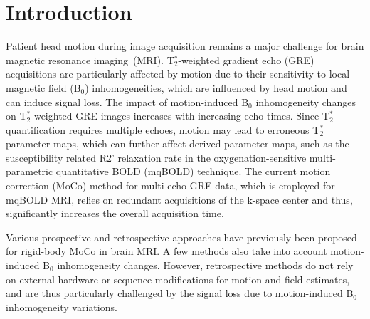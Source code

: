 \documentclass[AMA,STIX2COL]{MRM}
\newcommand{\tstar}[1]{{T$_2^*$}}
\begin{document}



\maketitle


\section{Introduction}\label{sec:intro} 
Patient head motion during image acquisition remains a major challenge for brain magnetic resonance imaging~(MRI). \tstar{}-weighted gradient echo (GRE) acquisitions are particularly affected by motion due to their sensitivity to local magnetic field (B$_0$) inhomogeneities, which are influenced by head motion and can induce signal loss.\cite{Liu_2018,Marques_2005} 
The impact of motion-induced B$_0$ inhomogeneity changes on \tstar{}-weighted GRE images increases with increasing echo times.\cite{Magerkurth_2011} 
Since \tstar{} quantification requires multiple echoes, motion may lead to erroneous \tstar{} parameter maps, 
which can further affect derived parameter maps, such as the susceptibility related R2’ relaxation rate in the oxygenation-sensitive multi-parametric quantitative BOLD (mqBOLD) technique. \cite{Hirsch_2014,Eichhorn_2023_ISMRM} The current motion correction (MoCo) method for multi-echo GRE data, which is employed for mqBOLD MRI, relies on redundant acquisitions of the k-space center and thus, significantly increases the overall acquisition time.\cite{Noth_2014}

Various prospective and retrospective approaches have previously been proposed for rigid-body MoCo in brain MRI.\cite{Godenschweger_2016} A few methods also take into account motion-induced B$_0$ inhomogeneity changes. \cite{vanderKouwe_2006,Matakos_2010,Brackenier_2022,Hewlett_2024ismrm} However, retrospective methods do not rely on external hardware or sequence modifications for motion and field estimates, and are thus particularly challenged by the signal loss due to motion-induced B$_0$ inhomogeneity variations.\cite{Godenschweger_2016}
\end{document}
